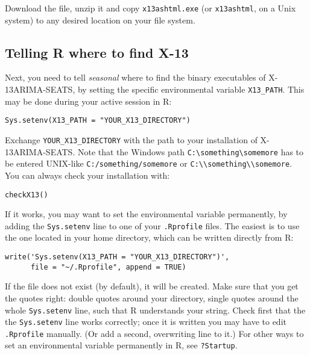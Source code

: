 Download the file, unzip it and copy \texttt{x13ashtml.exe} (or
\texttt{x13ashtml}, on a Unix system) to any desired location on your
file system.

\subsection{Telling R where to find
X-13}\label{telling-r-where-to-find-x-13}

Next, you need to tell \emph{seasonal} where to find the binary
executables of X-13ARIMA-SEATS, by setting the specific environmental
variable \texttt{X13\_PATH}. This may be done during your active session
in R:

\begin{verbatim}
Sys.setenv(X13_PATH = "YOUR_X13_DIRECTORY")
\end{verbatim}

Exchange \texttt{YOUR\_X13\_DIRECTORY} with the path to your
installation of X-13ARIMA-SEATS. Note that the Windows path
\texttt{C:\textbackslash{}something\textbackslash{}somemore} has to be
entered UNIX-like \texttt{C:/something/somemore} or
\texttt{C:\textbackslash{}\textbackslash{}something\textbackslash{}\textbackslash{}somemore}.
You can always check your installation with:

\begin{verbatim}
checkX13()
\end{verbatim}

If it works, you may want to set the environmental variable permanently,
by adding the \texttt{Sys.setenv} line to one of your \texttt{.Rprofile}
files. The easiest is to use the one located in your home directory,
which can be written directly from R:

\begin{verbatim}
write('Sys.setenv(X13_PATH = "YOUR_X13_DIRECTORY")', 
      file = "~/.Rprofile", append = TRUE)
\end{verbatim}

If the file does not exist (by default), it will be created. Make sure
that you get the quotes right: double quotes around your directory,
single quotes around the whole \texttt{Sys.setenv} line, such that R
understands your string. Check first that the the \texttt{Sys.setenv}
line works correctly; once it is written you may have to edit
\texttt{.Rprofile} manually. (Or add a second, overwriting line to it.)
For other ways to set an environmental variable permanently in R, see
\texttt{?Startup}.


